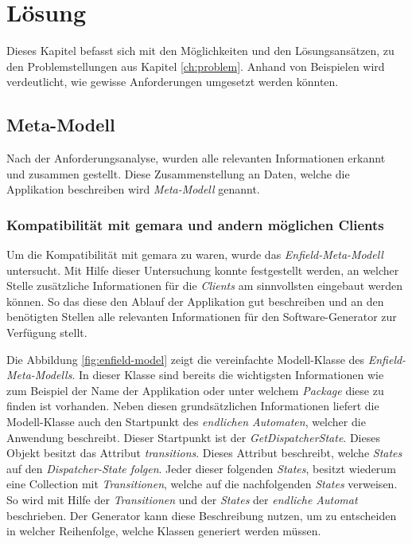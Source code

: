 \chapter{Lösung}
Dieses Kapitel befasst sich mit den Möglichkeiten und den Lösungsansätzen, zu den Problemstellungen aus Kapitel \ref{ch:problem}. Anhand von Beispielen wird verdeutlicht, wie gewisse Anforderungen umgesetzt werden könnten.

\section{Meta-Modell}
Nach der Anforderungsanalyse, wurden alle relevanten Informationen erkannt und zusammen gestellt. Diese Zusammenstellung an Daten, welche die Applikation beschreiben wird \textit{Meta-Modell} genannt.

\subsection{Kompatibilität mit \acs{gemara} und andern möglichen Clients}

Um die Kompatibilität mit \acf{gemara} zu waren, wurde das \textit{Enfield-Meta-Modell} untersucht. Mit Hilfe dieser Untersuchung konnte festgestellt werden, an welcher Stelle zusätzliche Informationen für die \textit{Clients} am sinnvollsten eingebaut werden können. So das diese den Ablauf der Applikation gut beschreiben und an den benötigten Stellen alle relevanten Informationen für den Software-Generator zur Verfügung stellt.

Die Abbildung \ref{fig:enfield-model} zeigt die vereinfachte Modell-Klasse des \textit{Enfield-Meta-Modells}. 
In dieser Klasse sind bereits die wichtigsten Informationen wie zum Beispiel der Name der Applikation oder unter welchem \textit{Package} diese zu finden ist vorhanden. Neben diesen grundsätzlichen Informationen liefert die Modell-Klasse auch den Startpunkt des \textit{endlichen Automaten}, welcher die Anwendung beschreibt. Dieser Startpunkt ist der \textit{GetDispatcherState}. Dieses Objekt besitzt das Attribut \textit{transitions}. Dieses Attribut beschreibt, welche \textit{States} auf den \textit{Dispatcher-State folgen}. Jeder dieser folgenden \textit{States}, besitzt wiederum eine Collection mit \textit{Transitionen}, welche auf die nachfolgenden \textit{States} verweisen. So wird mit Hilfe der \textit{Transitionen} und der \textit{States} der \textit{endliche Automat} beschrieben. Der Generator kann diese Beschreibung nutzen, um zu entscheiden in welcher Reihenfolge, welche Klassen generiert werden müssen.

